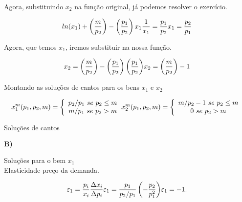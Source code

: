 \documentclass[a4paper, 12pt]{article} %
\begin{document}
\begin{flushleft}
\begin{center}
Agora, substituindo $x_{2}$ na função original, já podemos resolver o exercício.
\end{center}

\begin{equation}
ln(x_{1}) + \left( \dfrac{m}{p_{2}} \right) - \left( \dfrac{p_{1}}{p_{2}}\right) x_{1} 
$$\\$$
\dfrac{1}{x_{1}} = \dfrac{p_{1}}{p_{2}}
$$\\$$
x_{1} = \dfrac{p_{2}}{p_{1}}
\end{equation}

\begin{center}
Agora, que temos $x_{1}$, iremos substituir na nossa função.
\end{center}
\begin{equation}
 x_{2} = \left( \dfrac{m}{p_{2}} \right) - \left( \dfrac{p_{1}}{p_{2}}\right) \left( \dfrac{p_{1}}{p_{2}} \right)
 $$\\$$
 x_{2} = \left( \dfrac{m}{p_{2}} \right) - 1
\end{equation}

\begin{center}
Montando as soluções de cantos para os bens $x_{1}$ e $x_{2}$
\end{center}

\begin{equation}
x_{1}^m(p_{1},p_{2},m) = \left\{
\begin{array}{cc}
p_{2}/p_{1} \ se \ p_{2} \leq m \\
m/p_{1} \ se \ p_{2} > m
\end{array}
\right.
$$\\$$
x_{2}^m(p_{1},p_{2},m) = \left\{
\begin{array}{cc}
m/p_{2} - 1 \ se \ p_{2} \leq m \\
0 \ se \ p_{2} > m
\end{array}
\right.
\end{equation}

\begin{center}
Soluções de cantos
\end{center}
\singlespacing

\textbf{B)} 
\singlespacing

\begin{center}
	Soluções para o bem $x_{1}$
	\\
	Elasticidade-preço da demanda.
\end{center}

\begin{equation}
\varepsilon_{1} = \dfrac{p_{i}}{x_{i}} \dfrac{ \Delta x_{i}}{\Delta p_{i}}
$$\\$$
\varepsilon_{1} = \dfrac{p_{1}}{p_{2}/p_{1}} \left(- \dfrac{p_{2}}{p_{1}^2} \right)
$$\\$$
\varepsilon_{1} = -1.
\end{equation}


\end{flushleft}
\end{document}
